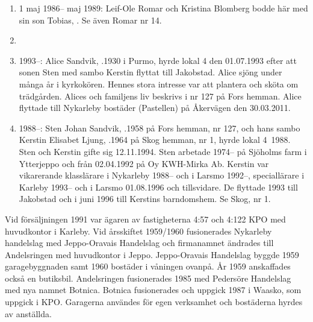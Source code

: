 \begin{enumerate}
  \item 1 maj 1986-- maj 1989: Leif-Ole Romar och Kristina Blomberg bodde här med sin son Tobias, . Se även Romar nr 14.
  \item {}
  \item 1993--: Alice Sandvik, .1930 i Purmo, hyrde lokal 4 den 01.07.1993 efter att sonen Sten med sambo Kerstin flyttat till Jakobstad. Alice sjöng under många år i kyrkokören. Hennes stora intresse var att plantera och sköta om trädgården. Alices och familjens liv beskrivs i nr 127 på Fors hemman. Alice flyttade till Nykarleby bostäder (Pastellen) på	Åkervägen den 30.03.2011.
  \item 1988--: Sten Johan Sandvik, .1958 på Fors hemman, nr 127, och hans sambo Kerstin Elisabet Ljung, .1964 på Skog hemman, nr 1, hyrde lokal 4 1988. Sten och Kerstin gifte sig 12.11.1994. Sten arbetade 1974-- på Sjöholms farm i Ytterjeppo och från 02.04.1992 på Oy KWH-Mirka Ab. Kerstin var vikarerande klasslärare i Nykarleby 1988-- och i Larsmo 1992--, speciallärare i Karleby 1993-- och i Larsmo 01.08.1996 och tillsvidare. De flyttade 1993 till Jakobstad och i juni 1996 till Kerstins barndomshem. Se Skog, nr 1.
\end{enumerate}


Vid försäljningen 1991 var ägaren av fastigheterna 4:57 och 4:122 KPO med huvudkontor i Karleby. Vid årsskiftet 1959/1960 fusionerades Nykarleby handelslag med Jeppo-Oravais Handelslag och firmanamnet ändrades till Andelsringen med huvudkontor i Jeppo. Jeppo-Oravais Handelslag byggde 1959	garagebyggnaden samt 1960 bostäder i våningen ovanpå. År 1959 anskaffades också en butiksbil. Andelsringen fusionerades 1985 med Pedersöre Handelslag med nya namnet Botnica. Botnica fusionerades och uppgick 1987 i Waasko, som uppgick i KPO. Garagerna användes för egen verksamhet och bostäderna hyrdes av anställda.

